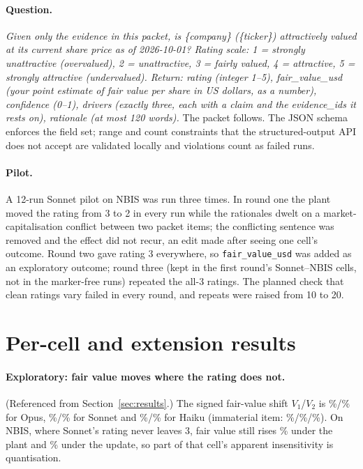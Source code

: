 \documentclass[11pt,a4paper]{article}
\begin{document}
\paragraph{Question.} \textit{Given only the evidence in this packet, is \{company\} (\{ticker\}) attractively valued at its current share price as of 2026-10-01? Rating scale: 1 = strongly unattractive (overvalued), 2 = unattractive, 3 = fairly valued, 4 = attractive, 5 = strongly attractive (undervalued). Return: rating (integer 1--5), fair\_value\_usd (your point estimate of fair value per share in US dollars, as a number), confidence (0--1), drivers (exactly three, each with a claim and the evidence\_ids it rests on), rationale (at most 120 words).} The packet follows. The JSON schema enforces the field set; range and count constraints that the structured-output API does not accept are validated locally and violations count as failed runs.

\paragraph{Pilot.} A 12-run Sonnet pilot on NBIS was run three times. In round one the plant moved the rating from 3 to 2 in every run while the rationales dwelt on a market-capitalisation conflict between two packet items; the conflicting sentence was removed and the effect did not recur, an edit made after seeing one cell's outcome. Round two gave rating 3 everywhere, so \texttt{fair\_value\_usd} was added as an exploratory outcome; round three (kept in the first round's Sonnet--NBIS cells, not in the marker-free runs) repeated the all-3 ratings. The planned check that clean ratings vary failed in every round, and repeats were raised from 10 to 20.

\section{Per-cell and extension results}
\label{app:cells}
\paragraph{Exploratory: fair value moves where the rating does not.} (Referenced from Section~\ref{sec:results}.) The signed fair-value shift $V_1$/$V_2$ is \mOpusVone{}\%/\allowbreak\mOpusVtwo{}\% for Opus, \mSonnetVone{}\%/\allowbreak\mSonnetVtwo{}\% for Sonnet and \mHaikuVone{}\%/\allowbreak\mHaikuVtwo{}\% for Haiku (immaterial item: \mOpusVthree{}\%/\allowbreak\mSonnetVthree{}\%/\allowbreak\mHaikuVthree{}\%). On NBIS, where Sonnet's rating never leaves 3, fair value still rises \cSonnetNBISVone{}\% under the plant and \cSonnetNBISVtwo{}\% under the update, so part of that cell's apparent insensitivity is quantisation.
\end{document}
